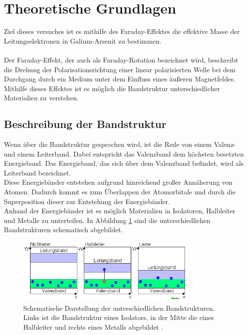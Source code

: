 \section{Theoretische Grundlagen}
Ziel dieses versuches ist es mithilfe des Faraday-Effektes die effektive Masse der Leitungselektronen in 
Galium-Arsenit zu bestimmen. \\
\\
Der Faraday-Effekt, der auch als Faraday-Rotation bezeichnet wird, beschreibt die Drehung der
Polarisationsrichtung einer linear polarisierten Welle bei dem Durchgang durch ein Medium 
unter dem Einfluss eines äußeren Magnetfeldes. Mithilfe dieses Effektes ist es möglich die 
Bandstruktur unterschiedlicher Materialien zu verstehen. \\

\subsection{Beschreibung der Bandstruktur}
Wenn über die Bandstruktur gesprochen wird, ist die Rede von einem Valenz- und einem Leiterband. 
Dabei entspricht das Valenzband dem höchsten besetzten Energieband. Das Energieband, das sich über dem 
Valenzband befindet, wird als Leiterband bezeichnet. \\
Diese Energiebänder entstehen aufgrund hinreichend großer Annäherung von Atomen. Dadurch kommt es zum 
Überlappen der Atomorbitale und durch die Superposition dieser zur Entstehung der Energiebänder. \\
Anhand der Energiebänder ist es möglich Materialien in Isolatoren, Halbleiter und Metalle zu unterteilen. 
In Abbildung \ref{fig:Bandstrukturen} sind die unterschiedlichen Bandstrukturen schematisch abgebildet.
\begin{figure}[H]
    \centering
    \includegraphics[width=0.8\textwidth]{images/Bandstruktur.png}
    \caption{Schematische Darstellung der unterschiedlichen Bandstrukturen. Links ist die Bandstruktur eines Isolators, 
    in der Mitte die eines Halbleiter und rechts eines Metalls abgebildet \cite{BS}.}
    \label{fig:Bandstrukturen}
\end{figure} \noindent

